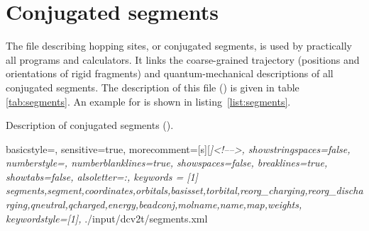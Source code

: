 \section{Conjugated segments}
\label{sec:xmlsegments}
The file describing hopping sites, or conjugated segments, is used by practically all programs and calculators. It links the coarse-grained trajectory (positions and orientations of rigid fragments) and quantum-mechanical descriptions of all conjugated segments. The description of this \xml file (\xmlsegments) is given in table \ref{tab:segments}. An example for \dcvt is shown in listing~\ref{list:segments}.
%
\begin{table}[h]
\caption{Description of conjugated segments (\xmlsegments).} 
\label{tab:segments}
 {\footnotesize  }
\end{table}
%
 {
   basicstyle=\ttfamily\scriptsize,
   sensitive=true,
   morecomment=[s][\color{gray}\rmfamily\itshape]{<!--}{-->}, 
   showstringspaces=false,
   numberstyle=\scriptsize,
   numberblanklines=true,
   showspaces=false,
   breaklines=true,
   showtabs=false,
   alsoletter={:},
   keywords = [1]
{segments,segment,coordinates,orbitals,basisset,torbital,reorg_charging,reorg_discharging,qneutral,qcharged,energy,beadconj,molname,name,map,weights},   
  keywordstyle={[1]\color{blue}},
}
%
%
{./input/dcv2t/segments.xml}



